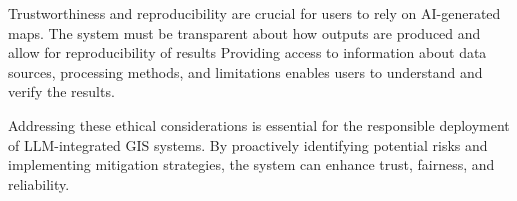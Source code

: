 Trustworthiness and reproducibility are crucial for users to rely on AI-generated maps. The system must be transparent about how outputs are produced and allow for reproducibility of results \cite{Li20234668, zhang_ethics_2023, wang_gpt_2024} Providing access to information about data sources, processing methods, and limitations enables users to understand and verify the results.

Addressing these ethical considerations is essential for the responsible deployment of LLM-integrated GIS systems. By proactively identifying potential risks and implementing mitigation strategies, the system can enhance trust, fairness, and reliability.
